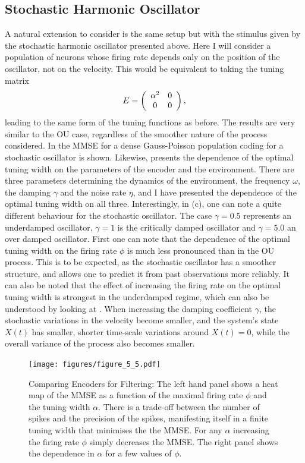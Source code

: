 \subsection{Stochastic Harmonic Oscillator}
A natural extension to consider is the same setup but with the stimulus given by the stochastic harmonic oscillator presented above. Here I will consider a population of neurons whose
firing rate depends only on the position of the oscillator, not on the velocity. This would be equivalent to taking the tuning matrix
\[
E = \left(\begin{array}{cc} \alpha^2 & 0\\0&0\end{array}\right),
\]
leading to the same form of the tuning functions as before.
The results are very similar to the OU case, 
regardless of the smoother nature of the process considered. In  the MMSE for a dense Gauss-Poisson population coding for
a stochastic oscillator is shown. Likewise,  presents the dependence of the optimal tuning width on the parameters of the encoder and the environment.
There are three parameters determining the dynamics of the environment, the frequency $\omega$, the damping $\gamma$ and the noise rate
$\eta$, and I have presented the dependence of the optimal tuning width on all three. Interestingly, in  (c), one can note a quite different behaviour for the
stochastic oscillator. The case $\gamma=0.5$ represents an underdamped oscillator, $\gamma=1$ is the critically damped oscillator and $\gamma=5.0$ an over damped oscillator.
First one can note that the dependence of the optimal tuning width on the firing rate $\phi$ is much less pronounced than in the OU process. This is to be expected, as the stochastic
oscillator has a smoother structure, and allows one to predict it from past observations more reliably. It can also be noted that the effect of increasing the firing rate on the optimal
tuning width is strongest in the underdamped regime, which can also be understood by looking at . When increasing the damping coefficient $\gamma$, the
stochastic variations in the velocity become smaller, and the system's state $X(t)$ has smaller, shorter time-scale variations around $X(t)=0$, while the overall variance of the process
also becomes smaller.

\begin{figure}
\label{fig:mmse_osc}
\texttt{[image: figures/figure\_5\_5.pdf]}
\caption[Optimal encoders for the stochastic harmonic oscillator.]{Comparing Encoders for Filtering: The left hand panel shows a heat map of the MMSE as a function of the maximal firing rate $\phi$ and the tuning
width $\alpha$. There is a trade-off between the number of spikes and the precision of the spikes, manifesting itself in a finite tuning width that minimises the
the MMSE. For any $\alpha$ increasing the firing rate $\phi$ simply decreases the MMSE. The right panel shows the dependence in $\alpha$ for a few values
of $\phi$.}
\end{figure}


